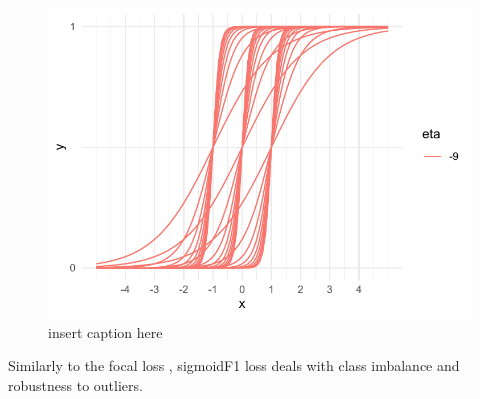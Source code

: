 \begin{figure}[htbp]
\centering
\includegraphics[width=.9\linewidth]{./images/sigmoid.pdf}
\caption{\label{fig:sigmoid}
insert caption here}
\end{figure}

Similarly to the focal loss \cite{focalLoss}, sigmoidF1 loss deals with class imbalance and robustness to outliers.












